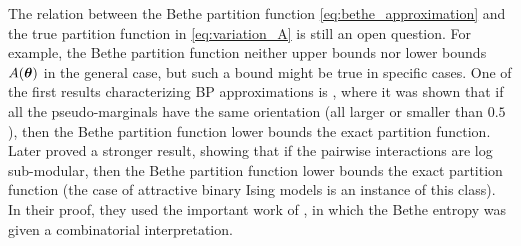 The relation between the Bethe partition function \eqref{eq:bethe_approximation} and the true partition function in \eqref{eq:variation_A} is still an open question.
 For example, the Bethe partition function neither upper bounds nor lower bounds $A(\boldsymbol{\theta})$ in the general case, but such a bound might be true in specific cases. One of the first results characterizing BP approximations is \cite{AlanNips2007}, where it was shown that if all the pseudo-marginals have the same orientation (all larger or smaller than $0.5$), then the Bethe partition function lower bounds the exact partition function.
Later \cite{RuozziNips2012} proved a stronger result, showing that if the pairwise interactions are log sub-modular, then the Bethe partition function lower bounds the exact partition function (the case of attractive binary Ising models is an instance of this class).
In their proof, they used the important work of  \cite{vontobel2013counting}, in which the Bethe entropy was given a combinatorial interpretation.

